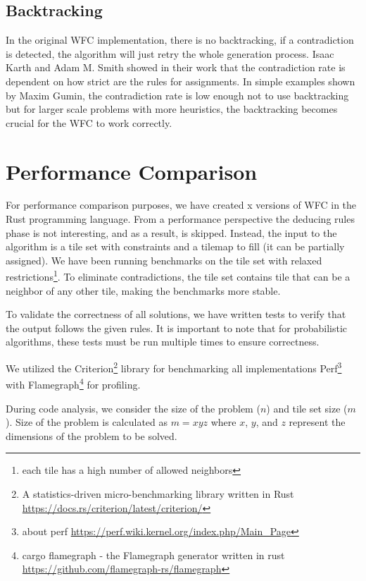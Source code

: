 \documentclass[shortabstract, english, inz]{iithesis}
\begin{document}
\section{Backtracking}
\label{backtracking}
In the original WFC implementation, there is no backtracking, if a contradiction is detected, the algorithm will just retry the whole generation process. Isaac Karth and Adam M. Smith showed in their work that the contradiction rate is dependent on how strict are the rules for assignments. In simple examples shown by Maxim Gumin, the contradiction rate is low enough not to use backtracking but for larger scale problems with more heuristics, the backtracking becomes crucial for the WFC to work correctly.
\cite{Smith}



\chapter{Performance Comparison}
\label{chapter4}
For performance comparison purposes, we have created x versions of WFC in the Rust programming language. From a performance perspective the deducing rules phase is not interesting, and as a result, is skipped. Instead, the input to the algorithm is a tile set with constraints and a tilemap to fill (it can be partially assigned). We have been running benchmarks on the tile set with relaxed restrictions\footnote{each tile has a high number of allowed neighbors}. To eliminate contradictions, the tile set contains tile that can be a neighbor of any other tile, making the benchmarks more stable.


To validate the correctness of all solutions, we have written tests to verify that the output follows the given rules. It is important to note that for probabilistic algorithms, these tests must be run multiple times to ensure correctness.


We utilized the Criterion\footnote{A statistics-driven micro-benchmarking library written in Rust \url{https://docs.rs/criterion/latest/criterion/}} library for benchmarking all implementations Perf\footnote{about perf \url{https://perf.wiki.kernel.org/index.php/Main_Page}} with Flamegraph\footnote{cargo flamegraph - the Flamegraph generator written in rust \url{https://github.com/flamegraph-rs/flamegraph}} for profiling.

During code analysis, we consider the size of the problem (\( n \)) and tile set size (\( m \)). Size of the problem is calculated as \( m = xyz\) where \(x\), \(y\), and \(z\) represent the dimensions of the problem to be solved.
\end{document}
